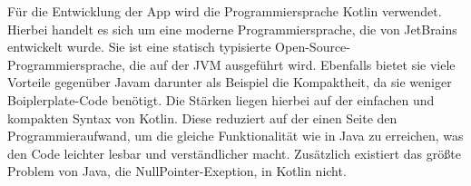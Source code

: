 \noindent
Für die Entwicklung der \ac{App} wird die Programmiersprache Kotlin verwendet. Hierbei handelt es sich um eine moderne Programmiersprache, die von JetBrains entwickelt wurde. Sie ist eine statisch typisierte Open-Source-Programmiersprache, die auf der \ac{JVM} ausgeführt wird. Ebenfalls bietet sie viele Vorteile gegenüber Javam darunter als Beispiel die Kompaktheit, da sie weniger Boiplerplate-Code benötigt. Die Stärken liegen hierbei auf der einfachen und kompakten Syntax von Kotlin. Diese reduziert auf der einen Seite den Programmieraufwand, um die gleiche Funktionalität wie in Java zu erreichen, was den Code leichter lesbar und verständlicher macht. Zusätzlich existiert das größte Problem von Java, die NullPointer-Exeption, in Kotlin nicht. \cite {bollhoff_kotlin_2022}
